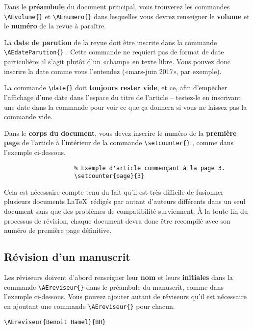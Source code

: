 \documentclass[french]{article}
\newcommand{\cmd}[1]{%
	\texttt{\textbackslash#1\{\}}
}
\begin{document}
			Dans le \textbf{préambule} du document principal, vous trouverez les commandes \cmd{AEvolume} et \cmd{AEnumero} dans
			lesquelles vous devrez renseigner le \textbf{volume} et le \textbf{numéro} de la revue à paraître.
			
			La \textbf{date de parution} de la revue doit être inscrite dans la commande \cmd{AEdateParution}. Cette commande ne requiert
			pas de
			format de date particulière; il s'agit plutôt d'un «champ» en texte libre. Vous pouvez donc inscrire la date comme
			vous l'entendez («mars-juin 2017», par exemple).
			
			La commande \cmd{date} doit \textbf{toujours rester vide}, et ce, afin d'empêcher l'affichage d'une date dans l'espace du
			titre de l'article -- testez-le en inscrivant une date dans la commande pour voir ce que ça donnera si vous ne laissez
			pas la commande vide.
			
			Dans le \textbf{corps du document}, vous devez inscrire le numéro de la \textbf{première page} de 
			l'article à	l'intérieur de la commande \cmd{setcounter}, comme dans l'exemple ci-dessous.
			
			\begin{shaded*}
				\begin{verbatim}
					% Exemple d'article commençant à la page 3.
					\setcounter{page}{3}
				\end{verbatim}
			\end{shaded*}
			
			Cela est nécessaire compte tenu du fait qu'il est très difficile de fusionner plusieurs documents \LaTeX\ rédigés par autant
			d'auteurs différents dans un seul document sans que des problèmes de compatibilité surviennent. À la toute fin du processus de révision, chaque document devra donc être recompilé avec son numéro de première page définitive.
			
		\subsection{Révision d'un manuscrit}
		
			Les réviseurs doivent d'abord renseigner leur \textbf{nom} et leurs \textbf{initiales} dans la commande
			\cmd{AEreviseur} dans le préambule du manuscrit, comme dans l'exemple ci-dessous. Vous pouvez ajouter autant
			de réviseurs qu'il est nécessaire en ajoutant une commande \cmd{AEreviseur} pour chacun.
			
			\begin{shaded*}
				\verb|\AEreviseur{Benoit Hamel}{BH}|
			\end{shaded*}
		
\end{document}
